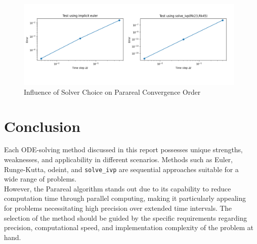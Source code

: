 \documentclass[a4paper,12pt,french]{article}
\begin{document}
\begin{figure}[ht!]
    \centering
    \includegraphics[width=1\textwidth]{img/order_converge.png}
    \caption{Influence of Solver Choice on Parareal Convergence Order}
    \label{fig:9}
\end{figure}
   

%
%




\newpage
\section{Conclusion}

Each ODE-solving method discussed in this report possesses unique strengths, weaknesses, and applicability in different scenarios. Methods such as Euler, Runge-Kutta, odeint, and \texttt{solve\_ivp} are sequential approaches suitable for a wide range of problems.\\

However, the Parareal algorithm stands out due to its capability to reduce computation time through parallel computing, making it particularly appealing for problems necessitating high precision over extended time intervals. The selection of the method should be guided by the specific requirements regarding precision, computational speed, and implementation complexity of the problem at hand.\\
\end{document}
